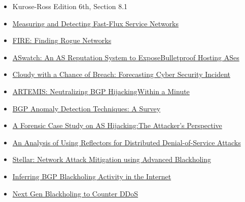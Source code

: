 \documentclass[11pt]{article}
\begin{document}
\begin{itemize}
\item Kurose-Ross Edition 6th, Section 8.1

\item \href{https://user.informatik.uni-goettingen.de/\~krieck/docs/2008-ndss.pdf}{Measuring and Detecting Fast-Flux Service Networks}

\item \href{https://sites.cs.ucsb.edu/\~chris/research/doc/acsac09\_fire.pdf}{FIRE: Finding Rogue Networks}

\item \href{https://conferences.sigcomm.org/sigcomm/2015/pdf/papers/p625.pdf}{ASwatch: An AS Reputation System to ExposeBulletproof Hosting ASes}

\item \href{https://www.usenix.org/system/files/conference/usenixsecurity15/sec15-paper-liu.pdf}{Cloudy with a Chance of Breach: Forecasting Cyber Security Incident}

\item \href{https://www.inspire.edu.gr/wp-content/pdfs/artemis\_TON2018.pdf}{ARTEMIS: Neutralizing BGP HijackingWithin a Minute}

\item \href{https://www.researchgate.net/profile/Bahaa\_Musawi/publication/309519246\_BGP\_Anomaly\_Detection\_Techniques\_A\_Survey/links/5a63db73aca272a1581bf3ea/BGP-Anomaly-Detection-Techniques-A-Survey.pdf}{BGP Anomaly Detection Techniques: A Survey}

\item \href{http://www.sigcomm.org/sites/default/files/ccr/papers/2013/April/2479957-2479959.pdf}{A Forensic Case Study on AS Hijacking:The Attacker’s Perspective}

\item \href{https://www.icir.org/vern/papers/reflectors.CCR.01.pdf}{An Analysis of Using Reflectors for Distributed Denial-of-Service Attacks}

\item \href{https://www.de-cix.net/Files/2731074c857497be3827ac9537b6e486f27aa57c/Research-paper-Stellar-Network-Attack-Mitigation-using-Advanced-Blackholing.pdf}{Stellar: Network Attack Mitigation using Advanced Blackholing}

\item \href{https://www.de-cix.net/Files/3dc6302479dc77225a799f83532945dbcb6ea236/Inferring-BGP-Blackholing-Activity.pdf}{Inferring BGP Blackholing Activity in the Internet}

\item \href{https://ripe78.ripe.net/presentations/9-RIPE\_Presentation\_MW.pdf}{Next Gen Blackholing to Counter DDoS}
\end{itemize}
\end{document}
